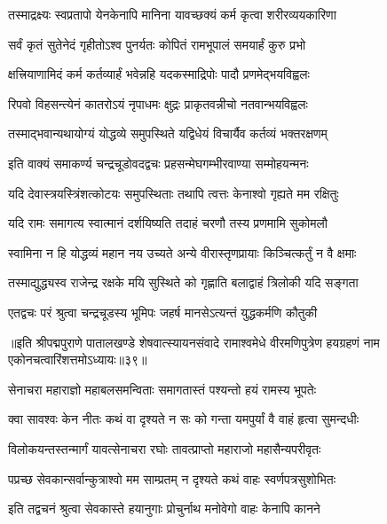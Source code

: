 \twolineshloka
{तस्माद्रक्ष्यः स्वप्रतापो येनकेनापि मानिना}
{यावच्छक्यं कर्म कृत्वा शरीरव्ययकारिणा}%

\twolineshloka
{सर्वं कृतं सुतेनेदं गृहीतोऽश्व पुनर्यतः}
{कोपितं रामभूपालं समयार्हं कुरु प्रभो}%

\twolineshloka
{क्षत्त्रियाणामिदं कर्म कर्तव्यार्हं भवेन्नहि}
{यदकस्माद्रिपोः पादौ प्रणमेद्भयविह्वलः}%

\twolineshloka
{रिपवो विहसन्त्येनं कातरोऽयं नृपाधमः}
{क्षुद्रः प्राकृतवन्नीचो नतवान्भयविह्वलः}%

\twolineshloka
{तस्माद्भवान्यथायोग्यं योद्धव्ये समुपस्थिते}
{यद्विधेयं विचार्यैव कर्तव्यं भक्तरक्षणम्}%


\twolineshloka
{इति वाक्यं समाकर्ण्य चन्द्रचूडोवदद्वचः}
{प्रहसन्मेघगम्भीरवाण्या सम्मोहयन्मनः}%

\twolineshloka
{यदि देवास्त्रयस्त्रिंशत्कोटयः समुपस्थिताः}
{तथापि त्वत्तः केनाश्वो गृह्यते मम रक्षितुः}%

\twolineshloka
{यदि रामः समागत्य स्वात्मानं दर्शयिष्यति}
{तदाहं चरणौ तस्य प्रणमामि सुकोमलौ}%

\twolineshloka
{स्वामिना न हि योद्धव्यं महान नय उच्यते}
{अन्ये वीरास्तृणप्रायाः किञ्चित्कर्तुं न वै क्षमाः}%

\twolineshloka
{तस्माद्युद्ध्यस्व राजेन्द्र रक्षके मयि सुस्थिते}
{को गृह्णाति बलाद्वाहं त्रिलोकी यदि सङ्गता}%


\twolineshloka
{एतद्वचः परं श्रुत्वा चन्द्रचूडस्य भूमिपः}
{जहर्ष मानसेऽत्यन्तं युद्धकर्मणि कौतुकी}%

{॥इति श्रीपद्मपुराणे पातालखण्डे शेषवात्स्यायनसंवादे रामाश्वमेधे वीरमणिपुत्रेण हयग्रहणं नाम एकोनचत्वारिंशत्तमोऽध्यायः॥३९॥}

\resetShloka


\twolineshloka
{सेनाचरा महाराज्ञो महाबलसमन्विताः}
{समागतास्तं पश्यन्तो हयं रामस्य भूपतेः}%

\twolineshloka
{क्वा सावश्वः केन नीतः कथं वा दृश्यते न सः}
{को गन्ता यमपुर्यां वै वाहं हृत्वा सुमन्दधीः}%

\twolineshloka
{विलोकयन्तस्तन्मार्गं यावत्सेनाचरा रघोः}
{तावत्प्राप्तो महाराजो महासैन्यपरीवृतः}%

\twolineshloka
{पप्रच्छ सेवकान्सर्वान्कुत्राश्वो मम साम्प्रतम्}
{न दृश्यते कथं वाहः स्वर्णपत्रसुशोभितः}%

\twolineshloka
{इति तद्वचनं श्रुत्वा सेवकास्ते हयानुगाः}
{प्रोचुर्नाथ मनोवेगो वाहः केनापि कानने}%


